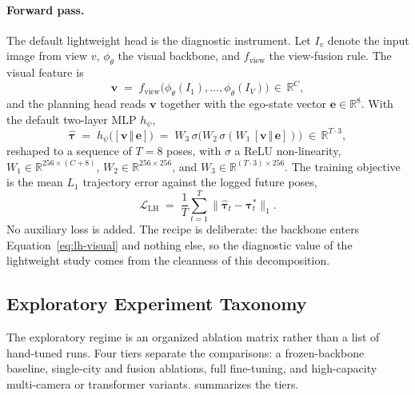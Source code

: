 \paragraph{Forward pass.}
The default lightweight head is the diagnostic instrument. Let $I_v$ denote the input image from view $v$, $\phi_\theta$ the visual backbone, and $f_\text{view}$ the view-fusion rule. The visual feature is
\begin{equation}
\label{eq:lh-visual}
\mathbf{v} \;=\; f_\text{view}\!\bigl(\phi_\theta(I_1), \dots, \phi_\theta(I_V)\bigr) \,\in\, \mathbb{R}^{C},
\end{equation}
and the planning head reads $\mathbf{v}$ together with the ego-state vector $\mathbf{e} \in \mathbb{R}^{8}$. With the default two-layer MLP $h_\psi$,
\begin{equation}
\label{eq:lh-mlp}
\hat{\boldsymbol\tau} \;=\; h_\psi\!\bigl([\mathbf{v}\,\Vert\,\mathbf{e}]\bigr)
\;=\; W_3\,\sigma\!\bigl(W_2\,\sigma(W_1\,[\mathbf{v}\,\Vert\,\mathbf{e}])\bigr)
\;\in\, \mathbb{R}^{T \cdot 3},
\end{equation}
reshaped to a sequence of $T = 8$ poses, with $\sigma$ a ReLU non-linearity, $W_1 \in \mathbb{R}^{256 \times (C + 8)}$, $W_2 \in \mathbb{R}^{256 \times 256}$, and $W_3 \in \mathbb{R}^{(T \cdot 3) \times 256}$. The training objective is the mean $L_1$ trajectory error against the logged future poses,
\begin{equation}
\label{eq:lh-loss}
\mathcal{L}_\text{LH} \;=\; \frac{1}{T}\sum_{t=1}^{T} \bigl\lVert \hat{\boldsymbol\tau}_t - \boldsymbol\tau^{\ast}_t \bigr\rVert_1.
\end{equation}
No auxiliary loss is added. The recipe is deliberate: the backbone enters Equation~\ref{eq:lh-visual} and nothing else, so the diagnostic value of the lightweight study comes from the cleanness of this decomposition.

\subsection{Exploratory Experiment Taxonomy}
\label{sec:meth-lh-taxonomy}

The exploratory regime is an organized ablation matrix rather than a list of hand-tuned runs. Four tiers separate the comparisons: a frozen-backbone baseline, single-city and fusion ablations, full fine-tuning, and high-capacity multi-camera or transformer variants.  summarizes the tiers.

